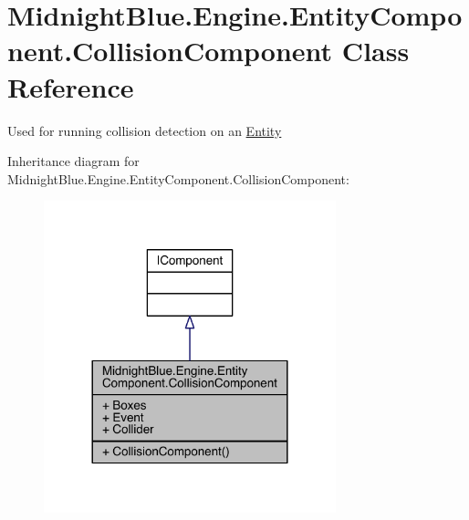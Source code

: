 \hypertarget{class_midnight_blue_1_1_engine_1_1_entity_component_1_1_collision_component}{}\section{Midnight\+Blue.\+Engine.\+Entity\+Component.\+Collision\+Component Class Reference}
\label{class_midnight_blue_1_1_engine_1_1_entity_component_1_1_collision_component}


Used for running collision detection on an \hyperlink{class_midnight_blue_1_1_engine_1_1_entity_component_1_1_entity}{Entity}  




Inheritance diagram for Midnight\+Blue.\+Engine.\+Entity\+Component.\+Collision\+Component\+:
\nopagebreak
\begin{figure}[H]
\begin{center}
\leavevmode
\includegraphics[width=240pt]{class_midnight_blue_1_1_engine_1_1_entity_component_1_1_collision_component__inherit__graph}
\end{center}
\end{figure}


